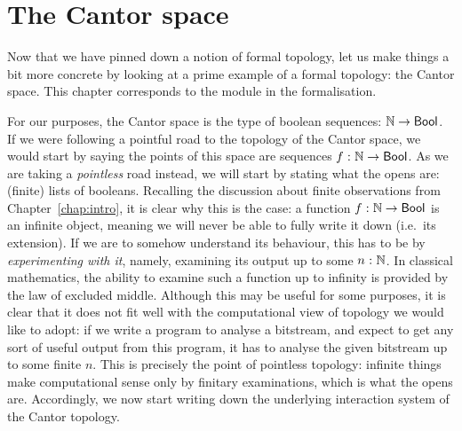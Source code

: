 \chapter{The Cantor space}\label{chap:cantor}

Now that we have pinned down a notion of formal topology, let us make things a bit more
concrete by looking at a prime example of a formal topology: the Cantor space. This
chapter corresponds to the  module in the \veragda{} formalisation.

For our purposes, the Cantor space is the type of boolean sequences: $\mathbb{N}{} \rightarrow \mathsf{Bool}{}$.
If we were following a pointful road to the topology of the Cantor space, we would start
by saying the points of this space are sequences $f\hspace{0.1mm}:\hspace{0.1mm}\mathbb{N}{} \rightarrow \mathsf{Bool}{}$. As we are
taking a \emph{pointless} road instead, we will start by stating what the opens are:
(finite) lists of booleans. Recalling the discussion about finite observations from
Chapter~\ref{chap:intro}, it is clear why this is the case: a function $f\hspace{0.1mm}:\hspace{0.1mm}\mathbb{N}{}
  \rightarrow \mathsf{Bool}{}$ is an infinite object, meaning we will never be able to fully write it down
(i.e.~its extension). If we are to somehow understand its behaviour, this has to be by
\emph{experimenting with it}, namely, examining its output up to some
$n\hspace{0.1mm}:\hspace{0.1mm}\mathbb{N}{}$. In classical mathematics, the ability to examine such a function up
to infinity is provided by the law of excluded middle. Although this may be useful for
some purposes, it is clear that it does not fit well with the computational view of
topology we would like to adopt: if we write a program to analyse a bitstream, and expect
to get any sort of useful output from this program, it has to analyse the given bitstream
up to some finite $n$. This is precisely the point of pointless topology: infinite things
make computational sense only by finitary examinations, which is what the opens are.
Accordingly, we now start writing down the underlying interaction system of the Cantor
topology.


